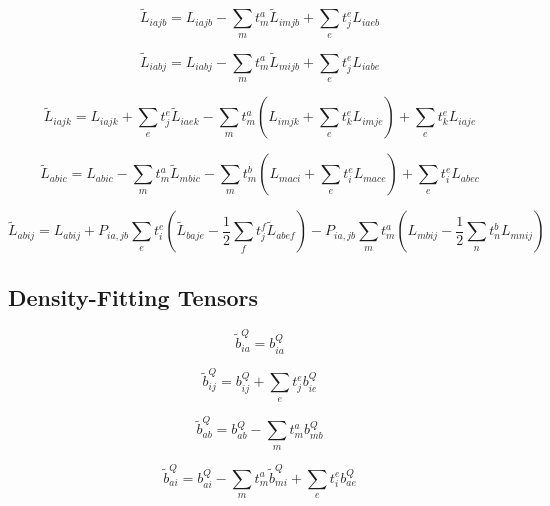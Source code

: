 \documentclass{article}
\begin{document}
\begin{equation}
  \tilde{L}_{iajb} = L_{iajb} - \sum_mt_m^a\tilde{L}_{imjb} + \sum_et_j^eL_{iaeb}
\end{equation}

\begin{equation}
  \tilde{L}_{iabj} = L_{iabj} - \sum_mt_m^a\tilde{L}_{mijb} + \sum_et_j^eL_{iabe}
\end{equation}

\begin{equation}
  \tilde{L}_{iajk} = L_{iajk} + \sum_et_j^e\tilde{L}_{iaek} - \sum_mt_m^a\left(L_{imjk} + \sum_et_k^eL_{imje}\right) + \sum_et_k^eL_{iaje}
\end{equation}

\begin{equation}
  \tilde{L}_{abic} = L_{abic} - \sum_mt_m^a\tilde{L}_{mbic} - \sum_mt_m^b\left(L_{maci} + \sum_et_i^eL_{mace}\right) + \sum_et_i^eL_{abec}
\end{equation}

\begin{equation}
  \tilde{L}_{abij} = L_{abij} + P_{ia,jb}\sum_et_i^e\left(\tilde{L}_{baje} - \frac{1}{2}\sum_ft_j^f\tilde{L}_{abef}\right) - P_{ia,jb}\sum_mt_m^a\left(L_{mbij} - \frac{1}{2}\sum_nt_n^bL_{mnij}\right)
\end{equation}

\subsection{Density-Fitting Tensors}

\begin{equation}
  \tilde{b}_{ia}^Q = b_{ia}^Q
\end{equation}

\begin{equation}
  \tilde{b}_{ij}^Q = b_{ij}^Q + \sum_et_j^eb_{ie}^Q
\end{equation}

\begin{equation}
  \tilde{b}_{ab}^Q = b_{ab}^Q - \sum_mt_m^ab_{mb}^Q
\end{equation}

\begin{equation}
  \tilde{b}_{ai}^Q = b_{ai}^Q - \sum_mt_m^a\tilde{b}_{mi}^Q + \sum_et_i^eb_{ae}^Q
\end{equation}
\end{document}
